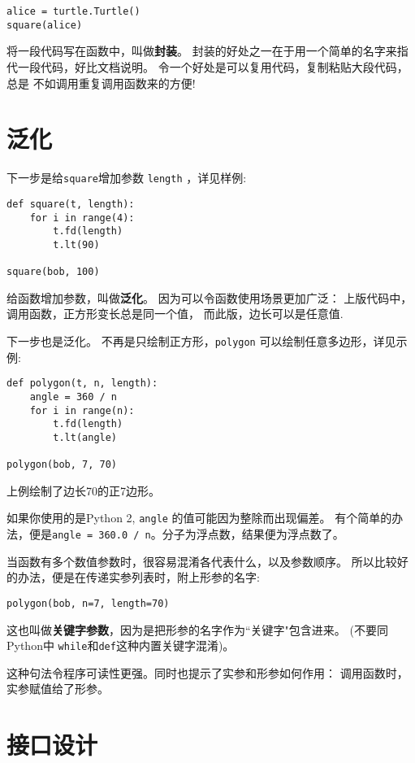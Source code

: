 \documentclass[10pt]{book}
\begin{document}
\begin{verbatim}
alice = turtle.Turtle()
square(alice)
\end{verbatim}
%
将一段代码写在函数中，叫做{\bf 封装}。
封装的好处之一在于用一个简单的名字来指代一段代码，好比文档说明。
令一个好处是可以复用代码，复制粘贴大段代码，总是
不如调用重复调用函数来的方便!


\section{泛化}

下一步是给{\tt square}增加参数 {\tt length} ，详见样例:

\begin{verbatim}
def square(t, length):
    for i in range(4):
        t.fd(length)
        t.lt(90)

square(bob, 100)
\end{verbatim}
%
给函数增加参数，叫做{\bf 泛化}。
因为可以令函数使用场景更加广泛：
上版代码中，调用函数，正方形变长总是同一个值，
而此版，边长可以是任意值.

下一步也是泛化。
不再是只绘制正方形，{\tt polygon} 可以绘制任意多边形，详见示例:

\begin{verbatim}
def polygon(t, n, length):
    angle = 360 / n
    for i in range(n):
        t.fd(length)
        t.lt(angle)

polygon(bob, 7, 70)
\end{verbatim}
%
上例绘制了边长70的正7边形。

如果你使用的是Python 2, {\tt angle} 的值可能因为整除而出现偏差。
有个简单的办法，便是{\tt angle = 360.0 / n}。分子为浮点数，结果便为浮点数了。

当函数有多个数值参数时，很容易混淆各代表什么，以及参数顺序。
所以比较好的办法，便是在传递实参列表时，附上形参的名字:

\begin{verbatim}
polygon(bob, n=7, length=70)
\end{verbatim}
%
这也叫做{\bf 关键字参数}，因为是把形参的名字作为``关键字"包含进来。
(不要同Python中 {\tt while}和{\tt def}这种内置关键字混淆)。

这种句法令程序可读性更强。同时也提示了实参和形参如何作用：
调用函数时，实参赋值给了形参。


\section{接口设计}
\end{document}
